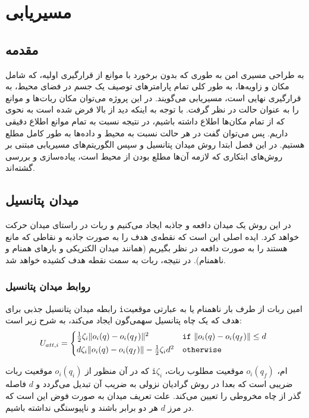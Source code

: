 \chapter{مسیریابی}\label{ch path planning}

\section{مقدمه}

به طراحی مسیری امن به طوری که بدون برخورد با موانع از قرارگیری اولیه، که شامل مکان و زاویه‌ها، به طور کلی تمام پارامترهای توصیف یک جسم در فضای محیط، به قرارگیری نهایی است، مسیریابی می‌گویند. در این پروژه می‌توان مکان ربات‌ها و موانع را به عنوان حالت در نظر گرفت. با توجه به اینکه دید از بالا فرض شده است به نحوی که از تمام مکان‌ها اطلاع داشته باشیم، در نتیجه نسبت به تمام موانع اطلاع دقیقی داریم. پس می‌توان گفت در هر حالت نسبت به محیط و داده‌ها به طور کامل مطلع هستیم. در این فصل ابتدا روش میدان پتانسیل و سپس الگوریتم‌های مسیریابی مبتنی بر روش‌های ابتکاری که لازمه آن‌ها مطلع بودن از محیط است، پیاده‌سازی و بررسی گشته‌اند.

\section{میدان پتانسیل}
در این روش یک میدان دافعه و جاذبه ایجاد می‌کنیم و ربات در راستای میدان حرکت خواهد کرد. ایده اصلی این است که نقطه‌ی هدف را به صورت جاذبه و نقاطی که مانع هستند را به صورت دافعه در نظر بگیریم (همانند میدان الکتریکی و بارهای همنام و ناهمنام). در نتیجه، ربات به سمت نقطه هدف کشیده خواهد شد.

\subsection{روابط میدان پتانسیل}
رابطه میدان پتانسیل جذبی برای \verb|i|امین ربات از طرف بار ناهمنام یا به عبارتی موقعیت هدف که یک چاه پتانسیل سهمی‌گون ایجاد می‌کند، به شرح زیر است:
\begin{equation}\label{eq Uatt}
U_{att,i} = 
\begin{cases*}
\frac{1}{2}\zeta_i\|o_i(q) - o_i(q_f)\|^2 & \verb|if| $\|o_i(q) - o_i(q_f)\| \le d$ \\
d\zeta_i\|o_i(q) - o_i(q_f)\|-\frac{1}{2}\zeta_id^2 & \verb|otherwise|
\end{cases*}
\end{equation}

که در آن منظور از $o_i(q_i)$ موقعیت ربات \verb|i|ام، $o_i(q_f)$ موقعیت مطلوب ربات، $\zeta_i$ ضریبی است که بعدا در روش گرادیان نزولی به ضریب آن تبدیل می‌گردد و $d$ فاصله گذر از چاه مخروطی را تعیین می‌کند. علت تعریف میدان به صورت فوض این است که در مرز $d$ هر دو برابر باشند و ناپیوستگی نداشته باشیم.

